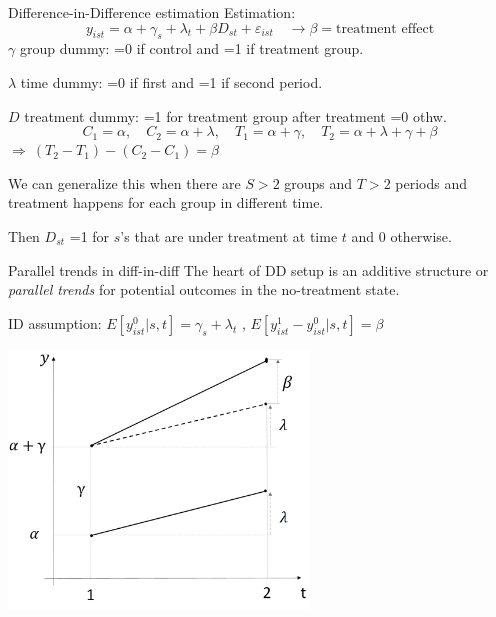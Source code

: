 \documentclass{beamer}
\begin{document}
\begin{frame}{Difference-in-Difference estimation}
Estimation:  \[y_{ist}=\alpha+\gamma_s+\lambda_t+\beta D_{st}+\varepsilon_{ist}\quad\rightarrow \beta=\text{treatment effect} \]
$\gamma$ group dummy: =0 if control and =1 if treatment group.

$\lambda$ time dummy: =0 if first and =1 if second period.

$D$ treatment dummy: =1 for treatment group after treatment =0 othw.
\[C_1=\alpha,\quad C_2=\alpha+\lambda,\quad T_1=\alpha+\gamma,\quad T_2=\alpha+\lambda+\gamma+\beta\]
$\Rightarrow \ (T_2-T_1)-(C_2-C_1)=\beta$\medskip

We can generalize this when there are $S>2$ groups and $T>2$ periods and treatment happens for each group in different time.

Then $D_{st}$ =1 for $s$'s that are under treatment at time $t$ and 0 otherwise.  

\end{frame}

\begin{frame}{Parallel trends in diff-in-diff}
The heart of DD setup is an additive structure or \textit{parallel trends} for potential outcomes in the no-treatment state.

ID assumption: $E[y^0_{ist}|s,t]=\gamma_s+\lambda_t$ ,    $E[y^1_{ist}-y^0_{ist}|s,t]=\beta$

\begin{center}
\includegraphics[width=0.6\textwidth]{./Figures/trend.png}
\end{center}

\end{frame}
\end{document}
